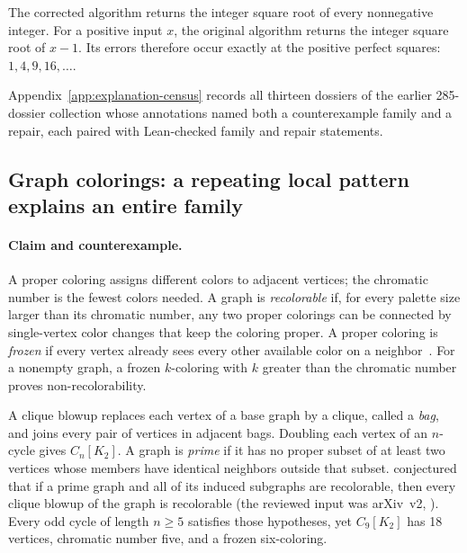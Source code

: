 \begin{proposition}
\label{prop:sqrt}
The corrected algorithm returns the integer square root of every nonnegative integer. For a positive input $x$, the original algorithm returns the integer square root of $x-1$. Its errors therefore occur exactly at the positive perfect squares: $1,4,9,16,\ldots$.
\end{proposition}
Appendix~\ref{app:explanation-census} records all thirteen dossiers of the earlier 285-dossier collection whose annotations named both a counterexample family and a repair, each paired with Lean-checked family and repair statements.

\subsection{Graph colorings: a repeating local pattern explains an entire family}
\paragraph{Claim and counterexample.}
A proper coloring assigns different colors to adjacent vertices; the chromatic number is the fewest colors needed. A graph is \emph{recolorable} if, for every palette size larger than its chromatic number, any two proper colorings can be connected by single-vertex color changes that keep the coloring proper. A proper coloring is \emph{frozen} if every vertex already sees every other available color on a neighbor~\citep{cereceda2008connectedness}. For a nonempty graph, a frozen $k$-coloring with $k$ greater than the chromatic number proves non-recolorability.

A clique blowup replaces each vertex of a base graph by a clique, called a \emph{bag}, and joins every pair of vertices in adjacent bags. Doubling each vertex of an $n$-cycle gives $C_n[K_2]$. A graph is \emph{prime} if it has no proper subset of at least two vertices whose members have identical neighbors outside that subset. \citet[Conjecture~1, \S6]{belavadi2026recoloring} conjectured that if a prime graph and all of its induced subgraphs are recolorable, then every clique blowup of the graph is recolorable (the reviewed input was arXiv~v2, \citealp{belavadi2024recoloringv2}). Every odd cycle of length $n\ge5$ satisfies those hypotheses, yet $C_9[K_2]$ has 18 vertices, chromatic number five, and a frozen six-coloring.



